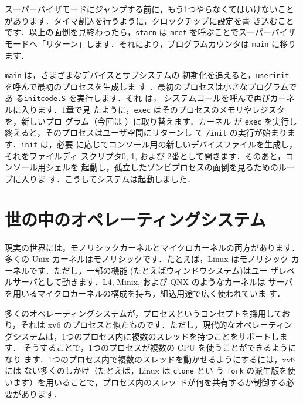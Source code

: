 スーパーバイザモードにジャンプする前に，もう1つやらなくてはいけないこと
があります．タイマ割込を行うように，クロックチップに設定を書
き込むことです．以上の面倒を見終わったら，\lstinline{starn} は \lstinline{mret}
を呼ぶことでスーパーバイザモードへ「リターン」します．それにより，プログラムカウンタは
\lstinline{main}  に移ります．

\lstinline{main}  は，さまざまなデバイスとサブシステムの
初期化を追えると，\lstinline{userinit} を呼んで最初のプロセスを生成しま
す ．最初のプロセスは小さなプログラムであ
る\lstinline{initcode.S}  を実行します．それ
は， システムコールを呼んで再びカーネルに入ります．1章で見
たように，\lstinline{exec} はそのプロセスのメモリやレジスタを，新しいプロ
グラム（今回は ）に取り替えます．カーネル
が \lstinline{exec} を実行し終えると，そのプロセスはユーザ空間にリターンし
て \lstinline{/init} の実行が始まります．\lstinline{init}  は，必要
に応じてコンソール用の新しいデバイスファイルを生成し，それをファイルディ
スクリプタ0, 1, および 2番として開きます．そのあと，コンソール用シェルを
起動し，孤立したゾンビプロセスの面倒を見るためのループに入りま
す．こうしてシステムは起動しました．

\section{世の中のオペレーティングシステム}

現実の世界には，モノリシックカーネルとマイクロカーネルの両方があります．
多くの Unix カーネルはモノリシックです．たとえば，Linux はモノリシック
カーネルです．ただし，一部の機能 (たとえばウィンドウシステム)はユー
ザレベルサーバとして動きます．L4, Minix, および QNX のようなカーネルは
サーバを用いるマイクロカーネルの構成を持ち，組込用途で広く使われていま
す．

多くのオペレーティングシステムが，プロセスというコンセプトを採用してお
り，それは xv6 のプロセスと似たものです．ただし，現代的なオペレーティン
グシステムは，1つのプロセス内に複数のスレッドを持つことをサポートします．
そうすることで，1つのプロセスが複数の CPU を使うことができるようになり
ます．1つのプロセス内で複数のスレッドを動かせるようにするには，xv6 には
ない多くのしかけ（たとえば，Linux は \lstinline{clone} とい
う \lstinline{fork} の派生版を使います）を用いることで，プロセス内のスレッ
ドが何を共有するか制御する必要があります．

